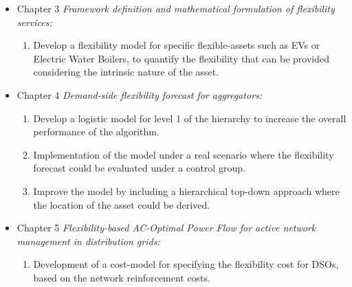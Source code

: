 \begin{itemize}
\item Chapter 3 \textit{Framework definition and mathematical formulation of flexibility services:} 
	\begin{enumerate}
		\item Develop a flexibility model for specific flexible-assets such as EVs or Electric Water Boilers, to quantify the flexibility that can be provided considering the intrinsic nature of the asset. 
	\end{enumerate}
\item Chapter 4 \textit{Demand-side flexibility forecast for aggregators:} 
	\begin{enumerate}
		\item Develop a logistic model for level 1 of the hierarchy to increase the overall performance of the algorithm. 
		\item Implementation of the model under a real scenario where the flexibility forecast could be evaluated under a control group.  
		\item Improve the model by including a hierarchical top-down approach where the location of the asset could be derived. 
	\end{enumerate}
\item Chapter 5 \textit{Flexibility-based AC-Optimal Power Flow for active network management in distribution grids:} 
	\begin{enumerate}
		\item Development of a cost-model for specifying the flexibility cost for DSOs, based on the network reinforcement costs. 

\end{enumerate}
\end{itemize}
